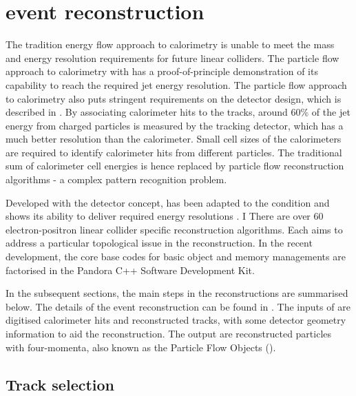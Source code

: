 \section{\pandora event reconstruction}
\label{sec:pandoraPandoraPFA}

The tradition energy flow approach to calorimetry is unable to meet the mass and energy resolution requirements for future linear colliders. The particle flow approach to calorimetry with \pandora has a proof-of-principle demonstration of its capability to reach the required jet energy resolution. The particle flow approach to calorimetry  also puts stringent requirements on the detector design, which is described in . By associating calorimeter hits to the tracks, around 60\% of the jet energy from charged particles is measured by the tracking detector, which has a much better resolution than the calorimeter. Small cell sizes of the calorimeters are required to identify calorimeter hits from different particles. The traditional sum of calorimeter cell energies is hence replaced by particle flow reconstruction algorithms - a complex pattern recognition problem.

Developed with the \ILD detector concept, \pandora has been adapted to the \CLIC condition and shows its ability to deliver required energy resolutions \cite{Linssen:2012hp}.  I There are over 60 electron-positron linear collider specific reconstruction algorithms. Each aims to address a particular topological issue in the reconstruction. In the recent development, the core base codes for basic object and memory managements are factorised in the Pandora C++ Software Development Kit\cite{Marshall:2015rfa}.

In the subsequent sections, the main steps in the \pandora reconstructions are summarised below. The details of the \pandora event reconstruction can be found in \cite{Thomson:2009rp,Marshall:2012ry,Marshall:2015rfa}.  The inputs of \pandora are digitised calorimeter hits and reconstructed tracks, with some detector geometry information to aid the reconstruction. The output are reconstructed particles with four-momenta, also known as the Particle Flow Objects (\PFOs).

\subsection{Track selection}
\label{sec:pandoraPandoraTrack}

